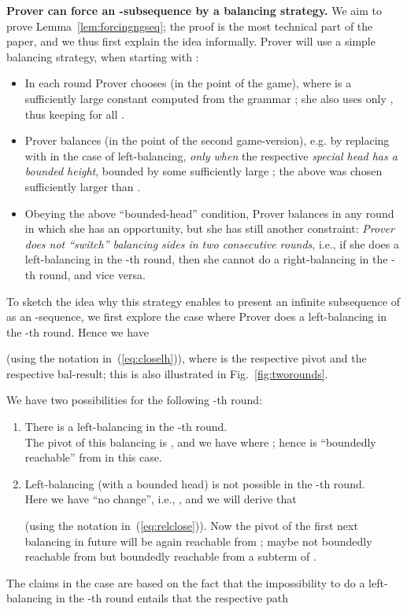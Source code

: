 \documentclass{llncs}
\begin{document}
\textbf{Prover can force an -subsequence by a balancing
strategy.}
We aim to prove Lemma~\ref{lem:forcingngseq}; the proof is the most
technical part of the paper, and we thus first 
explain the idea informally. 
Prover will use a simple balancing strategy, when starting with
:
\begin{itemize}
	\item		
In each round Prover chooses  (in the point  of
the game), where  is a sufficiently large constant computed from
the grammar ; she also uses only , thus
keeping  for all .
\item
Prover balances (in the point  of the second game-version),
e.g. by replacing  with  
 in the case of left-balancing,
\emph{only when} the respective \emph{special head  
has a bounded height}, bounded by some sufficiently large ;
the above
 was chosen sufficiently larger than .
\item
Obeying the above ``bounded-head'' condition, 
Prover balances in any round in which she has an opportunity,
but she has still another
constraint: \emph{Prover does not ``switch'' balancing sides
	in two consecutive
rounds}, i.e.,
if she does a left-balancing
in the -th round, then she cannot do a right-balancing 
in the -th round, and vice versa.
\end{itemize}
To sketch the idea why this strategy enables to present 
an infinite subsequence of  as
an -sequence, we first explore the case 
where Prover does a left-balancing in the -th round.
Hence we have 
\begin{center}

\end{center}
(using the notation in~(\ref{eq:closelh})), where  is the
respective pivot and  the respective bal-result;
this is also illustrated in Fig.~\ref{fig:tworounds}.


We have two possibilities for the following -th round:
\begin{enumerate}
	\item		
There is a left-balancing in the  -th round.
\\
The pivot of this balancing 
is , and we have 
 where
; hence  is ``boundedly reachable'' from  in this case. 

\item
Left-balancing (with a bounded head) is not possible
in the  -th round.
\\
Here we have ``no change'', i.e., 
, and we will derive that 
 
(using the notation in~(\ref{eq:relclose})).
Now the pivot  of the first next balancing in future
will be again reachable from ; maybe not boundedly reachable from  but
boundedly
reachable from a subterm of .
\end{enumerate}
The claims in the case  
are based on the fact that the impossibility to do a
left-balancing in the  -th round
entails that 
 the respective path 
 
\end{document}
